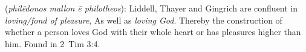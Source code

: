 \item[Loving pleasure rather than loving God,]

(\textit{philēdonos mallon ē philotheos}):
Liddell, Thayer and Gingrich are confluent in \emph{loving/fond of pleasure}, As well as \emph{loving God}. Thereby the construction of whether a person loves God with their whole heart or has pleasures higher than him.
Found in 2~Tim 3:4.
